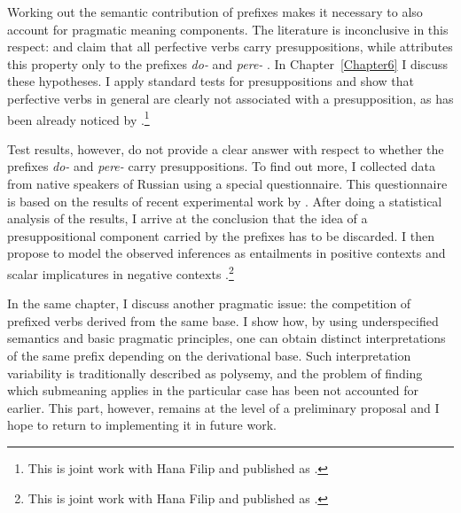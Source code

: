 Working out the semantic contribution of prefixes makes it necessary to also account for pragmatic meaning components. The literature is inconclusive in this respect: \citet{Paducheva:96} and \citet{Romanova:06} claim that all perfective verbs  carry presuppositions, while \citet{Kagan:book} attributes this property only to the prefixes \textit{do-}   and \textit{pere-}  . In Chapter~\ref{Chapter6} I discuss these hypotheses. I apply standard tests for presuppositions and show that perfective verbs  in general are clearly not associated with a presupposition, as has been already noticed by \citet{Gronn:04}.\footnote{This is joint work with Hana Filip and published as \citealt{ZinovaFilip:14}.}

Test results, however, do not provide a clear answer with respect to whether the prefixes \textit{do-}   and \textit{pere-}   carry presuppositions. To find out more, I collected data from native speakers of Russian using a special questionnaire. This questionnaire is based on the results of recent experimental work by \citet{Chemla:09}. After doing a statistical analysis of the results, I arrive at the conclusion that the idea of a presuppositional component carried by the prefixes has to be discarded. I then propose to model the observed inferences as entailments in positive contexts   and scalar implicatures in negative contexts  .\footnote{This is joint work with Hana Filip and published as \citealt{ZinovaFilip:SALT}.}

In the same chapter, I discuss another pragmatic issue: the competition of prefixed verbs derived from the same base. I show how, by using underspecified semantics and basic pragmatic principles, one can obtain distinct interpretations of the same prefix depending on the derivational base. Such interpretation variability is traditionally described as polysemy, and the problem of finding which submeaning applies in the particular case has been not accounted for earlier. This part, however, remains at the level of a preliminary proposal and I hope to return to implementing it in future  work.

